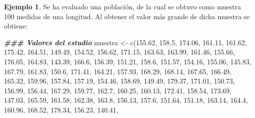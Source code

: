 \documentclass[
]{article}
\newenvironment{Shaded}{\begin{snugshade}}{\end{snugshade}}
\newcommand{\DocumentationTok}[1]{\textcolor[rgb]{0.56,0.35,0.01}{\textbf{\textit{#1}}}}
\newcommand{\FloatTok}[1]{\textcolor[rgb]{0.00,0.00,0.81}{#1}}
\newcommand{\FunctionTok}[1]{\textcolor[rgb]{0.00,0.00,0.00}{#1}}
\newcommand{\NormalTok}[1]{#1}
\newcommand{\OtherTok}[1]{\textcolor[rgb]{0.56,0.35,0.01}{#1}}
\theoremstyle{definition}
\theoremstyle{definition}
\newtheorem{example}{Ejemplo}[section]
\theoremstyle{definition}
\theoremstyle{definition}
\theoremstyle{remark}
\begin{document}
\begin{example}

Se ha evaluado una población, de la cual se obtuvo como muestra 100 medidas de una longitud. Al obtener el valor más grande de dicha muestra se obtiene:

\begin{Shaded}
\begin{Highlighting}[]
\DocumentationTok{\#\#\# Valores del estudio}
\NormalTok{muestra }\OtherTok{\textless{}{-}} \FunctionTok{c}\NormalTok{(}\FloatTok{155.62}\NormalTok{, }\FloatTok{158.5}\NormalTok{, }\FloatTok{174.06}\NormalTok{, }\FloatTok{161.11}\NormalTok{, }\FloatTok{161.62}\NormalTok{, }\FloatTok{175.42}\NormalTok{, }\FloatTok{164.51}\NormalTok{, }\FloatTok{149.49}\NormalTok{, }
         \FloatTok{154.52}\NormalTok{, }\FloatTok{156.62}\NormalTok{, }\FloatTok{171.15}\NormalTok{, }\FloatTok{163.63}\NormalTok{, }\FloatTok{163.99}\NormalTok{, }\FloatTok{161.46}\NormalTok{, }\FloatTok{155.66}\NormalTok{, }\FloatTok{176.05}\NormalTok{,}
         \FloatTok{164.83}\NormalTok{, }\FloatTok{143.39}\NormalTok{, }\FloatTok{166.6}\NormalTok{, }\FloatTok{156.39}\NormalTok{, }\FloatTok{151.21}\NormalTok{, }\FloatTok{158.6}\NormalTok{, }\FloatTok{151.57}\NormalTok{, }\FloatTok{154.16}\NormalTok{, }
         \FloatTok{155.06}\NormalTok{, }\FloatTok{145.83}\NormalTok{, }\FloatTok{167.79}\NormalTok{, }\FloatTok{161.83}\NormalTok{, }\FloatTok{150.6}\NormalTok{, }\FloatTok{171.41}\NormalTok{, }\FloatTok{164.21}\NormalTok{, }\FloatTok{157.93}\NormalTok{, }
         \FloatTok{168.29}\NormalTok{, }\FloatTok{168.14}\NormalTok{, }\FloatTok{167.65}\NormalTok{, }\FloatTok{166.49}\NormalTok{, }\FloatTok{165.32}\NormalTok{, }\FloatTok{159.96}\NormalTok{, }\FloatTok{157.84}\NormalTok{, }\FloatTok{157.19}\NormalTok{,}
         \FloatTok{154.46}\NormalTok{, }\FloatTok{158.69}\NormalTok{, }\FloatTok{149.49}\NormalTok{, }\FloatTok{179.37}\NormalTok{, }\FloatTok{171.01}\NormalTok{, }\FloatTok{150.73}\NormalTok{, }\FloatTok{156.99}\NormalTok{, }\FloatTok{156.44}\NormalTok{, }
         \FloatTok{167.29}\NormalTok{, }\FloatTok{159.77}\NormalTok{, }\FloatTok{162.7}\NormalTok{, }\FloatTok{160.25}\NormalTok{, }\FloatTok{160.13}\NormalTok{, }\FloatTok{172.41}\NormalTok{, }\FloatTok{158.54}\NormalTok{, }\FloatTok{173.69}\NormalTok{, }
         \FloatTok{147.03}\NormalTok{, }\FloatTok{165.59}\NormalTok{, }\FloatTok{161.58}\NormalTok{, }\FloatTok{162.38}\NormalTok{, }\FloatTok{163.8}\NormalTok{, }\FloatTok{156.13}\NormalTok{, }\FloatTok{157.6}\NormalTok{, }\FloatTok{151.64}\NormalTok{, }
         \FloatTok{151.18}\NormalTok{, }\FloatTok{163.14}\NormalTok{, }\FloatTok{164.4}\NormalTok{, }\FloatTok{160.96}\NormalTok{, }\FloatTok{168.52}\NormalTok{, }\FloatTok{178.34}\NormalTok{, }\FloatTok{156.23}\NormalTok{, }\FloatTok{140.41}\NormalTok{, }

\end{Highlighting}
\end{Shaded}
\end{example}
\end{document}
